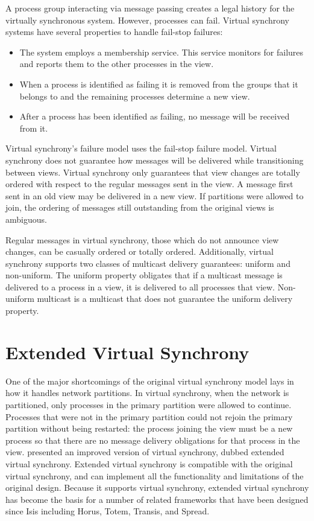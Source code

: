 A process group interacting via message passing creates a legal history for the virtually synchronous system. However, processes can fail.  Virtual synchrony systems have several properties to handle fail-stop failures\cite[p~.102]{ISISTOOLKIT}:

\begin{itemize}
    \item The system employs a membership service. This service monitors for failures and reports them to the other processes in the view.
    \item When a process is identified as failing it is removed from the groups that it belongs to and the remaining processes determine a new view.
    \item After a process has been identified as failing, no message will be received from it.
\end{itemize}

Virtual synchrony's failure model uses the fail-stop failure model. Virtual synchrony does not guarantee how messages will be delivered while transitioning between views. Virtual synchrony only guarantees that view changes are totally ordered with respect to the regular messages sent in the view. A message first sent in an old view may be delivered in a new view. If partitions were allowed to join, the ordering of messages still outstanding from the original views is ambiguous.

Regular messages in virtual synchrony, those which do not announce view changes, can be casually ordered or totally ordered. Additionally, virtual synchrony supports two classes of multicast delivery guarantees: uniform and non-uniform. The uniform property obligates that if a multicast message is delivered to a process in a view, it is delivered to all processes that view. Non-uniform multicast is a multicast that does not guarantee the uniform delivery property.

\section{Extended Virtual Synchrony}
One of the major shortcomings of the original virtual synchrony model lays in how it handles network partitions. In virtual synchrony, when the network is partitioned, only processes in the primary partition were allowed to continue. Processes that were not in the primary partition could not rejoin the primary partition without being restarted: the process joining the view must be a new process so that there are no message delivery obligations for that process in the view. \cite{EXTENDEDVIRTUALSYNCHRONY} presented an improved version of virtual synchrony, dubbed extended virtual synchrony. Extended virtual synchrony is compatible with the original virtual synchrony, and can implement all the functionality and limitations of the original design. Because it supports virtual synchrony, extended virtual synchrony has become the basis for a number of related frameworks that have been designed since Isis including Horus, Totem, Transis, and Spread.

